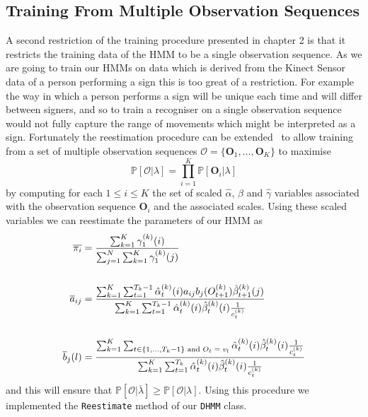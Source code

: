 \subsection{Training From Multiple Observation Sequences}
A second restriction of the training procedure presented in chapter 2 is that it restricts the training data of the HMM to be a single observation sequence. As we are going to train our HMMs on data which is derived from the Kinect Sensor data of a person performing a sign this is too great of a restriction. For example the way in which a person performs a sign will be unique each time and will differ between signers, and so to train a recogniser on a single observation sequence would not fully capture the range of movements which might be interpreted as a sign. Fortunately the reestimation procedure can be extended~\citep{li2000training, van2010can, rabiner1989tutorial} to allow training from a set of multiple observation sequences $\mathcal{O} =\{\mathbf{O}_1, \dots, \mathbf{O}_{K}\}$ to maximise 
\begin{equation*}
\mathbb{P}[\mathcal{O}|\lambda] = \prod_{i=1}^{K}\mathbb{P}[\mathbf{O}_i|\lambda]
\end{equation*}
by computing for each $1 \leq i \leq K$ the set of scaled $\hat{\alpha}$, $\hat{\beta}$ and $\hat{\gamma}$ variables associated with the observation sequence $\mathbf{O}_i$ and the associated scales. Using these scaled variables we can reestimate the parameters of our HMM as
\begin{align*}
\overline{\pi_i} &= \frac{\sum_{k=1}^{K}\gamma^{(k)}_1(i)}{\sum_{j=1}^{N}\sum_{k=1}^{K}\gamma^{(k)}_1(j)}\\
\vspace{30mm}\\
\overline{a}_{ij} &= \frac{\sum_{k=1}^{K}\sum_{t=1}^{T_k-1}\hat{\alpha}^{(k)}_t(i) a_{ij} b_j(O^{(k)}_{t+1}) \hat{\beta}^{(k)}_{t+1}(j)}{\sum_{k=1}^{K}\sum_{t=1}^{T_k-1}\hat{\alpha}^{(k)}_t(i)\hat{\beta}^{(k)}_t(i)\frac{1}{c^{(k)}_t}}\\
\vspace{30mm}\\
\overline{b}_j(l) &= \frac{\sum_{k=1}^{K}\sum_{t \in \{1,\dots,T_k-1\}\text{ and $O_t = v_l$}}\hat{\alpha}^{(k)}_t(i)\hat{\beta}^{(k)}_t(i)\frac{1}{c^{(k)}_t}}{\sum_{k=1}^{K}\sum_{t=1}^{T_k}\hat{\alpha}^{(k)}_t(i)\hat{\beta}^{(k)}_t(i)\frac{1}{c^{(k)}_t}} \\
\end{align*}
and this will ensure that $\mathbb{P}[\mathcal{O}|\overline{\lambda}] \geq \mathbb{P}[\mathcal{O}|\lambda]$. Using this procedure we implemented the \verb|Reestimate| method of our \verb|DHMM| class.

